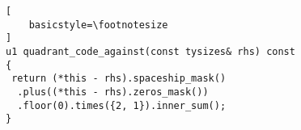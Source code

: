 \begin{lstlisting}[
    basicstyle=\footnotesize
]
u1 quadrant_code_against(const tysizes& rhs) const 
{
 return (*this - rhs).spaceship_mask()
  .plus((*this - rhs).zeros_mask())
  .floor(0).times({2, 1}).inner_sum(); 
}
\end{lstlisting}%
